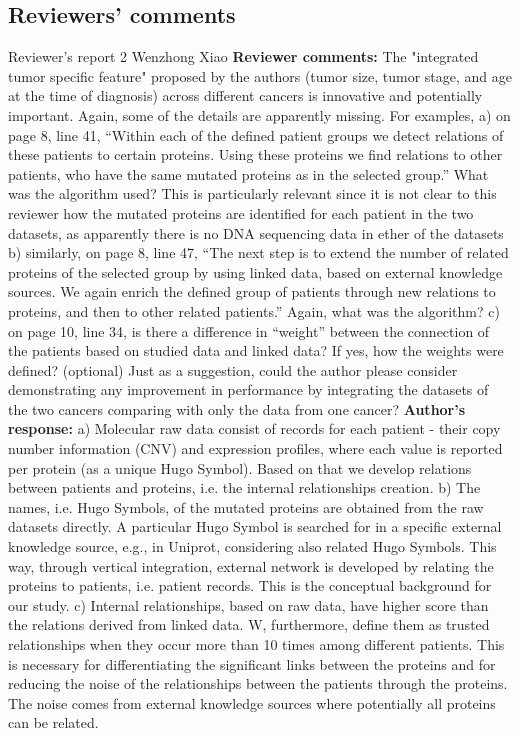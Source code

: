 \documentclass{bmcart}
\begin{document}
\begin{backmatter}
 
\section*{Reviewers' comments}
\newline Reviewer's report 2
\newline Wenzhong Xiao
\newline \textbf{Reviewer comments:}
The "integrated tumor specific feature" proposed by the authors (tumor size, tumor stage, and age at the time of diagnosis) across different cancers is innovative and potentially important. Again, some of the details are apparently missing. For examples, a) on page 8, line 41, “Within each of the defined patient groups we detect relations of these patients to certain proteins. Using these proteins we find relations to other patients, who have the same mutated proteins as in the selected group.” What was the algorithm used? This is particularly relevant since it is not clear to this reviewer how the mutated proteins are identified for each patient in the two datasets, as apparently there is no DNA sequencing data in ether of the datasets
b) similarly, on page 8, line 47, “The next step is to extend the number of related proteins of the selected group by using linked data, based on external knowledge sources. We again enrich the defined group of patients through new relations to proteins, and then to other related patients.” Again, what was the algorithm?
c) on page 10, line 34, is there a difference in “weight” between the connection of the patients based on studied data and linked data? If yes, how the weights were defined? (optional) Just as a suggestion, could the author please consider demonstrating any improvement in performance by integrating the datasets of the two cancers comparing with only the data from one cancer?
\newline \textbf{Author's response:}
a) Molecular raw data consist of records for each patient - their copy number information (CNV) and expression profiles, where each value is reported per protein (as a unique Hugo Symbol). Based on that we develop relations between patients and proteins, i.e. the internal relationships creation. b) The names, i.e. Hugo Symbols, of the mutated proteins are obtained from the raw datasets directly. A particular Hugo Symbol is searched for in a specific external knowledge source, e.g., in Uniprot, considering also related Hugo Symbols. This way, through vertical integration, external network is developed by relating the proteins to patients, i.e. patient records. This is the conceptual background for our study.
c) Internal relationships, based on raw data, have higher score than the relations derived from linked data. W, furthermore, define them as trusted relationships when they occur more than 10 times among different patients. This is necessary for differentiating the significant links between the proteins and for reducing the noise of the relationships between the patients through the proteins. The noise comes from external knowledge sources where potentially all proteins can be related.



\end{backmatter}
\end{document}
